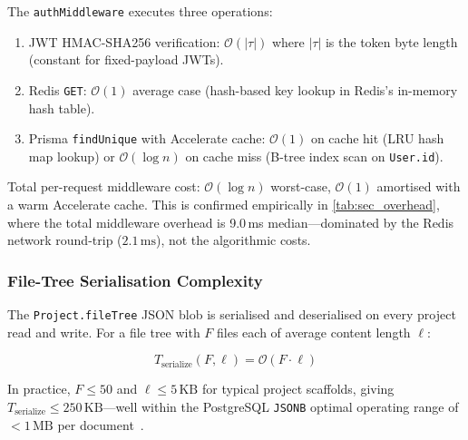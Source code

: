 The \texttt{authMiddleware} executes three operations:
\begin{enumerate}[leftmargin=*, label=\arabic*.]
  \item JWT HMAC-SHA256 verification: $\mathcal{O}(|\tau|)$ where $|\tau|$
    is the token byte length (constant for fixed-payload JWTs).
  \item Redis \texttt{GET}: $\mathcal{O}(1)$ average case (hash-based
    key lookup in Redis's in-memory hash table).
  \item Prisma \texttt{findUnique} with Accelerate cache:
    $\mathcal{O}(1)$ on cache hit (LRU hash map lookup) or
    $\mathcal{O}(\log n)$ on cache miss (B-tree index scan on \texttt{User.id}).
\end{enumerate}

Total per-request middleware cost: $\mathcal{O}(\log n)$ worst-case,
$\mathcal{O}(1)$ amortised with a warm Accelerate cache. This is confirmed
empirically in \cref{tab:sec_overhead}, where the total middleware overhead
is 9.0\,ms median---dominated by the Redis network round-trip
($2.1\,\text{ms}$), not the algorithmic costs.

\subsubsection{File-Tree Serialisation Complexity}

The \texttt{Project.fileTree} JSON blob is serialised and deserialised on
every project read and write. For a file tree with $F$ files each of average
content length $\ell$:

\begin{equation}
  T_{\text{serialize}}(F, \ell) = \mathcal{O}(F \cdot \ell)
  \label{eq:serialize}
\end{equation}

In practice, $F \leq 50$ and $\ell \leq 5\,\text{KB}$ for typical project
scaffolds, giving $T_{\text{serialize}} \leq 250\,\text{KB}$---well within
the PostgreSQL \texttt{JSONB} optimal operating range of $<\!1\,\text{MB}$
per document~\cite{postgresql2024}.
